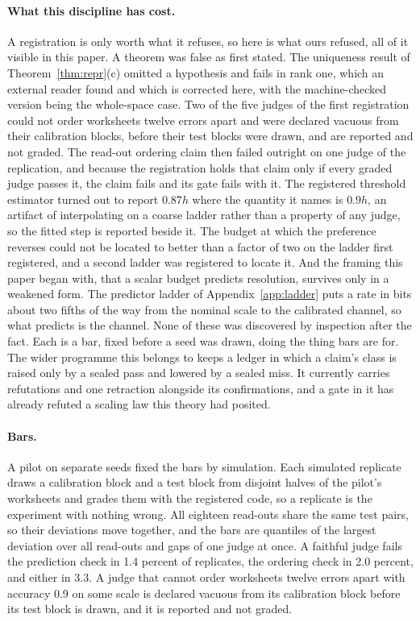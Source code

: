 \documentclass{article}
\theoremstyle{definition}
\theoremstyle{remark}
\begin{document}
\paragraph{What this discipline has cost.}
A registration is only worth what it refuses, so here is what ours refused, all of it visible in this paper.
A theorem was false as first stated. The uniqueness result of Theorem~\ref{thm:repr}(c) omitted a hypothesis and fails in rank one, which an external reader found and which is corrected here, with the machine-checked version being the whole-space case.
Two of the five judges of the first registration could not order worksheets twelve errors apart and were declared vacuous from their calibration blocks, before their test blocks were drawn, and are reported and not graded.
The read-out ordering claim then failed outright on one judge of the replication, and because the registration holds that claim only if every graded judge passes it, the claim fails and its gate fails with it.
The registered threshold estimator turned out to report $0.87h$ where the quantity it names is $0.9h$, an artifact of interpolating on a coarse ladder rather than a property of any judge, so the fitted step is reported beside it.
The budget at which the preference reverses could not be located to better than a factor of two on the ladder first registered, and a second ladder was registered to locate it.
And the framing this paper began with, that a scalar budget predicts resolution, survives only in a weakened form. The predictor ladder of Appendix~\ref{app:ladder} puts a rate in bits about two fifths of the way from the nominal scale to the calibrated channel, so what predicts is the channel.
None of these was discovered by inspection after the fact. Each is a bar, fixed before a seed was drawn, doing the thing bars are for.
The wider programme this belongs to keeps a ledger in which a claim's class is raised only by a sealed pass and lowered by a sealed miss. It currently carries refutations and one retraction alongside its confirmations, and a gate in it has already refuted a scaling law this theory had posited.

\paragraph{Bars.}
A pilot on separate seeds fixed the bars by simulation.
Each simulated replicate draws a calibration block and a test block from disjoint halves of the pilot's worksheets and grades them with the registered code, so a replicate is the experiment with nothing wrong.
All eighteen read-outs share the same test pairs, so their deviations move together, and the bars are quantiles of the largest deviation over all read-outs and gaps of one judge at once.
A faithful judge fails the prediction check in 1.4 percent of replicates, the ordering check in 2.0 percent, and either in 3.3.
A judge that cannot order worksheets twelve errors apart with accuracy 0.9 on some scale is declared vacuous from its calibration block before its test block is drawn, and it is reported and not graded.
\end{document}
